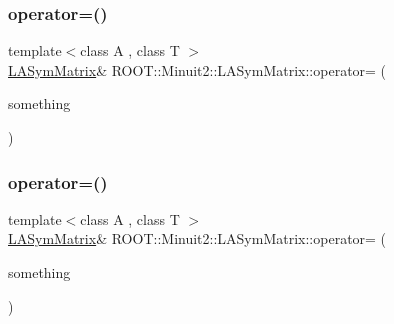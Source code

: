 \subsubsection{\texorpdfstring{operator=()}{operator=()}\hspace{0.1cm}{\footnotesize\ttfamily [5/14]}}
{\footnotesize\ttfamily template$<$class A , class T $>$ \\
\mbox{\hyperlink{classROOT_1_1Minuit2_1_1LASymMatrix}{L\+A\+Sym\+Matrix}}\& R\+O\+O\+T\+::\+Minuit2\+::\+L\+A\+Sym\+Matrix\+::operator= (\begin{DoxyParamCaption}\item[{const \mbox{\hyperlink{classROOT_1_1Minuit2_1_1ABObj}{A\+B\+Obj}}$<$ \mbox{\hyperlink{classROOT_1_1Minuit2_1_1sym}{sym}}, \mbox{\hyperlink{classROOT_1_1Minuit2_1_1ABObj}{A\+B\+Obj}}$<$ \mbox{\hyperlink{classROOT_1_1Minuit2_1_1sym}{sym}}, A, T $>$, T $>$ \&}]{something }\end{DoxyParamCaption})\hspace{0.3cm}{\ttfamily [inline]}}

\mbox{\label{classROOT_1_1Minuit2_1_1LASymMatrix_ad9610e3f4b18a52ab16644373e179acc}} 
\subsubsection{\texorpdfstring{operator=()}{operator=()}\hspace{0.1cm}{\footnotesize\ttfamily [6/14]}}
{\footnotesize\ttfamily template$<$class A , class T $>$ \\
\mbox{\hyperlink{classROOT_1_1Minuit2_1_1LASymMatrix}{L\+A\+Sym\+Matrix}}\& R\+O\+O\+T\+::\+Minuit2\+::\+L\+A\+Sym\+Matrix\+::operator= (\begin{DoxyParamCaption}\item[{const \mbox{\hyperlink{classROOT_1_1Minuit2_1_1ABObj}{A\+B\+Obj}}$<$ \mbox{\hyperlink{classROOT_1_1Minuit2_1_1sym}{sym}}, \mbox{\hyperlink{classROOT_1_1Minuit2_1_1ABObj}{A\+B\+Obj}}$<$ \mbox{\hyperlink{classROOT_1_1Minuit2_1_1sym}{sym}}, A, T $>$, T $>$ \&}]{something }\end{DoxyParamCaption})\hspace{0.3cm}{\ttfamily [inline]}}

\mbox{\label{classROOT_1_1Minuit2_1_1LASymMatrix_a88d40828624a6418f8b94e239e30d322}} 
